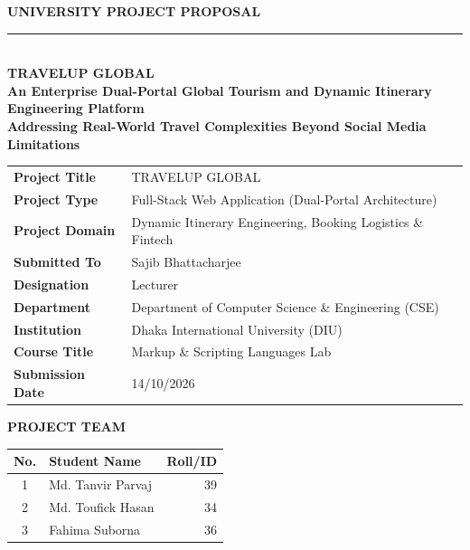\documentclass[11pt,a4paper]{article}
\begin{document}
\begin{titlepage}
    \centering
    \vspace*{0.3cm}
    
    {\large\bfseries\textcolor{primary}{UNIVERSITY PROJECT PROPOSAL}}\\[0.2cm]
    {\color{primary}\rule{0.6\textwidth}{2.2pt}}\\[0.6cm]
    
    {\Huge \textbf{\textcolor{secondary}{TRAVELUP GLOBAL}}}\\[0.3cm]
    {\large \textbf{An Enterprise Dual-Portal Global Tourism and Dynamic Itinerary Engineering Platform}}\\[0.2cm]
    {\normalsize \textbf{Addressing Real-World Travel Complexities Beyond Social Media Limitations}}\\[0.55cm]
    
    \renewcommand{\arraystretch}{1.22}
    \begin{tabularx}{\textwidth}{@{}>{\bfseries}p{5.2cm} X@{}}
        Project Title           & TRAVELUP GLOBAL \\
        Project Type            & Full-Stack Web Application (Dual-Portal Architecture) \\
        Project Domain          & Dynamic Itinerary Engineering, Booking Logistics \& Fintech \\
        Submitted To            & Sajib Bhattacharjee \\
        Designation             & Lecturer \\
        Department              & Department of Computer Science \& Engineering (CSE) \\
        Institution             & Dhaka International University (DIU) \\
        Course Title            & Markup \& Scripting Languages Lab \\
        Submission Date         & 14/10/2026 \\
    \end{tabularx}
    
    \vspace{0.6cm}
    
    {\bfseries\textcolor{secondary}{\large PROJECT TEAM}}\\[0.15cm]
    \renewcommand{\arraystretch}{1.25}
    \begin{tabularx}{\textwidth}{c X r}
        \toprule
        \textbf{No.} & \textbf{Student Name} & \textbf{Roll/ID} \\
        \midrule
        1 & Md. Tanvir Parvaj & 39 \\
        2 & Md. Toufick Hasan & 34 \\
        3 & Fahima Suborna    & 36 \\
        \bottomrule
    \end{tabularx}
    

\end{titlepage}
\end{document}
